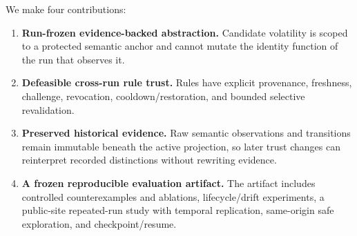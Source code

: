 \documentclass[conference]{IEEEtran}
\begin{document}
We make four contributions:
\begin{enumerate}
  \item \textbf{Run-frozen evidence-backed abstraction.} Candidate volatility is scoped to a protected semantic anchor and cannot mutate the identity function of the run that observes it.
  \item \textbf{Defeasible cross-run rule trust.} Rules have explicit provenance, freshness, challenge, revocation, cooldown/restoration, and bounded selective revalidation.
  \item \textbf{Preserved historical evidence.} Raw semantic observations and transitions remain immutable beneath the active projection, so later trust changes can reinterpret recorded distinctions without rewriting evidence.
  \item \textbf{A frozen reproducible evaluation artifact.} The artifact includes controlled counterexamples and ablations, lifecycle/drift experiments, a public-site repeated-run study with temporal replication, same-origin safe exploration, and checkpoint/resume.
\end{enumerate}
\end{document}
